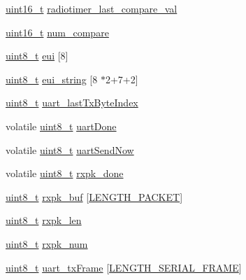 \begin{DoxyCompactItemize}
\hyperlink{_p_e___types_8h_a1f1825b69244eb3ad2c7165ddc99c956}{uint16\+\_\+t} \hyperlink{structapp__vars__t_ae71aed926934fca39541078d444d56b9}{radiotimer\+\_\+last\+\_\+compare\+\_\+val}
\item 
\hyperlink{_p_e___types_8h_a1f1825b69244eb3ad2c7165ddc99c956}{uint16\+\_\+t} \hyperlink{structapp__vars__t_a26afb2869274446da1b06398cafc5733}{num\+\_\+compare}
\item 
\hyperlink{_p_e___types_8h_aba7bc1797add20fe3efdf37ced1182c5}{uint8\+\_\+t} \hyperlink{structapp__vars__t_a628b747f9f8c53fe1f54038fc94be9cb}{eui} \mbox{[}8\mbox{]}
\item 
\hyperlink{_p_e___types_8h_aba7bc1797add20fe3efdf37ced1182c5}{uint8\+\_\+t} \hyperlink{structapp__vars__t_aeceb033a92dc93021f443b2d44804f64}{eui\+\_\+string} \mbox{[}8 $\ast$2+7+2\mbox{]}
\item 
\hyperlink{_p_e___types_8h_aba7bc1797add20fe3efdf37ced1182c5}{uint8\+\_\+t} \hyperlink{structapp__vars__t_a7dde50f28e9c80df28276a328a0ae7fb}{uart\+\_\+last\+Tx\+Byte\+Index}
\item 
volatile \hyperlink{_p_e___types_8h_aba7bc1797add20fe3efdf37ced1182c5}{uint8\+\_\+t} \hyperlink{structapp__vars__t_a5b5b4d44bc83bb4886ec04334c9d63dc}{uart\+Done}
\item 
volatile \hyperlink{_p_e___types_8h_aba7bc1797add20fe3efdf37ced1182c5}{uint8\+\_\+t} \hyperlink{structapp__vars__t_a96b871efdd04e503fbc394d1dd24bdd3}{uart\+Send\+Now}
\item 
volatile \hyperlink{_p_e___types_8h_aba7bc1797add20fe3efdf37ced1182c5}{uint8\+\_\+t} \hyperlink{structapp__vars__t_ad4ad635d2de9a09a9451e976191ac7e8}{rxpk\+\_\+done}
\item 
\hyperlink{_p_e___types_8h_aba7bc1797add20fe3efdf37ced1182c5}{uint8\+\_\+t} \hyperlink{structapp__vars__t_affbd644e41b23269590ffb85561abc40}{rxpk\+\_\+buf} \mbox{[}\hyperlink{samr21__xpro_200std__low__power__mode_200std__low__power__mode_8c_ab23dc632cb92506d08a47330e5869366}{L\+E\+N\+G\+T\+H\+\_\+\+P\+A\+C\+K\+ET}\mbox{]}
\item 
\hyperlink{_p_e___types_8h_aba7bc1797add20fe3efdf37ced1182c5}{uint8\+\_\+t} \hyperlink{structapp__vars__t_a93da463733561ea25e5baa994e56553c}{rxpk\+\_\+len}
\item 
\hyperlink{_p_e___types_8h_aba7bc1797add20fe3efdf37ced1182c5}{uint8\+\_\+t} \hyperlink{structapp__vars__t_a2e2d5e7e8da76c605ac5865e18dd6139}{rxpk\+\_\+num}
\item 
\hyperlink{_p_e___types_8h_aba7bc1797add20fe3efdf37ced1182c5}{uint8\+\_\+t} \hyperlink{structapp__vars__t_a8f1c35d04eaa891d5a6a91ca5ed022ab}{uart\+\_\+tx\+Frame} \mbox{[}\hyperlink{01bsp__radio__rx_8c_a0659bf652dc91608d99d86aadc095872}{L\+E\+N\+G\+T\+H\+\_\+\+S\+E\+R\+I\+A\+L\+\_\+\+F\+R\+A\+ME}\mbox{]}

\end{DoxyCompactItemize}
